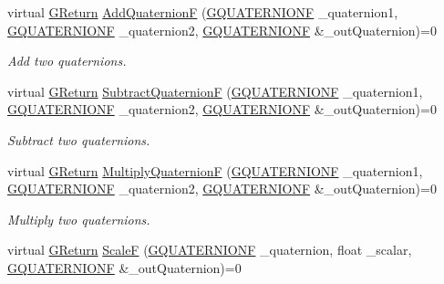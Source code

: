 \begin{DoxyCompactItemize}
\item 
virtual \mbox{\hyperlink{namespaceGW_a67a839e3df7ea8a5c5686613a7a3de21}{G\+Return}} \mbox{\hyperlink{classGW_1_1MATH_1_1GQuaternion_a8022f790af2feae15bc99c753b5578fe}{Add\+QuaternionF}} (\mbox{\hyperlink{structGW_1_1MATH_1_1GQUATERNIONF}{G\+Q\+U\+A\+T\+E\+R\+N\+I\+O\+NF}} \+\_\+quaternion1, \mbox{\hyperlink{structGW_1_1MATH_1_1GQUATERNIONF}{G\+Q\+U\+A\+T\+E\+R\+N\+I\+O\+NF}} \+\_\+quaternion2, \mbox{\hyperlink{structGW_1_1MATH_1_1GQUATERNIONF}{G\+Q\+U\+A\+T\+E\+R\+N\+I\+O\+NF}} \&\+\_\+out\+Quaternion)=0
\begin{DoxyCompactList}\small\item\em Add two quaternions. \end{DoxyCompactList}\item 
virtual \mbox{\hyperlink{namespaceGW_a67a839e3df7ea8a5c5686613a7a3de21}{G\+Return}} \mbox{\hyperlink{classGW_1_1MATH_1_1GQuaternion_a73e2c8974e1b6b87624763e59b6af801}{Subtract\+QuaternionF}} (\mbox{\hyperlink{structGW_1_1MATH_1_1GQUATERNIONF}{G\+Q\+U\+A\+T\+E\+R\+N\+I\+O\+NF}} \+\_\+quaternion1, \mbox{\hyperlink{structGW_1_1MATH_1_1GQUATERNIONF}{G\+Q\+U\+A\+T\+E\+R\+N\+I\+O\+NF}} \+\_\+quaternion2, \mbox{\hyperlink{structGW_1_1MATH_1_1GQUATERNIONF}{G\+Q\+U\+A\+T\+E\+R\+N\+I\+O\+NF}} \&\+\_\+out\+Quaternion)=0
\begin{DoxyCompactList}\small\item\em Subtract two quaternions. \end{DoxyCompactList}\item 
virtual \mbox{\hyperlink{namespaceGW_a67a839e3df7ea8a5c5686613a7a3de21}{G\+Return}} \mbox{\hyperlink{classGW_1_1MATH_1_1GQuaternion_ad63c0c42b4c60910e40dbcedb497d4d0}{Multiply\+QuaternionF}} (\mbox{\hyperlink{structGW_1_1MATH_1_1GQUATERNIONF}{G\+Q\+U\+A\+T\+E\+R\+N\+I\+O\+NF}} \+\_\+quaternion1, \mbox{\hyperlink{structGW_1_1MATH_1_1GQUATERNIONF}{G\+Q\+U\+A\+T\+E\+R\+N\+I\+O\+NF}} \+\_\+quaternion2, \mbox{\hyperlink{structGW_1_1MATH_1_1GQUATERNIONF}{G\+Q\+U\+A\+T\+E\+R\+N\+I\+O\+NF}} \&\+\_\+out\+Quaternion)=0
\begin{DoxyCompactList}\small\item\em Multiply two quaternions. \end{DoxyCompactList}\item 
virtual \mbox{\hyperlink{namespaceGW_a67a839e3df7ea8a5c5686613a7a3de21}{G\+Return}} \mbox{\hyperlink{classGW_1_1MATH_1_1GQuaternion_ac807f57d533c019733a517566615516e}{ScaleF}} (\mbox{\hyperlink{structGW_1_1MATH_1_1GQUATERNIONF}{G\+Q\+U\+A\+T\+E\+R\+N\+I\+O\+NF}} \+\_\+quaternion, float \+\_\+scalar, \mbox{\hyperlink{structGW_1_1MATH_1_1GQUATERNIONF}{G\+Q\+U\+A\+T\+E\+R\+N\+I\+O\+NF}} \&\+\_\+out\+Quaternion)=0

\end{DoxyCompactItemize}
